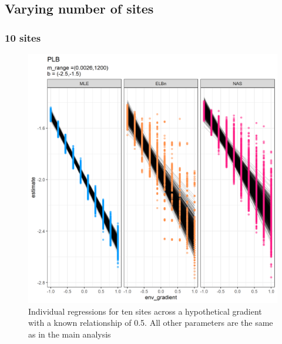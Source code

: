 \documentclass[
]{article}
\begin{document}
\hypertarget{varying-number-of-sites}{%
\subsection{Varying number of sites}\label{varying-number-of-sites}}

\hypertarget{sites}{%
\subsubsection{10 sites}\label{sites}}

\begin{figure}
\centering
\includegraphics{figures/PLB_10_sites_main.png}
\caption{Individual regressions for ten sites across a hypothetical
gradient with a known relationship of 0.5. All other parameters are the
same as in the main analysis}
\end{figure}

\newpage
\end{document}
